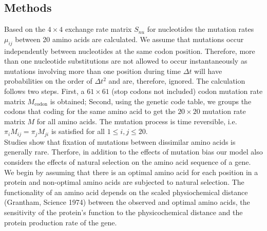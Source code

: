 \documentclass[13pt]{article}
\begin{document}
\subsection{Methods}
Based on the $4 \times 4$ exchange rate matrix $S_{nu}$ for nucleotides the mutation rates $\mu_{ij}$ between 20 amino acids are calculated. We assume that mutations occur independently between nucleotides at the same codon position. Therefore, more than one nucleotide substitutions are not allowed to occur instantaneously as mutations involving more than one position during time $\Delta t$ will have probabilities on the order of $\Delta t^2$ and are, therefore, ignored. The calculation follows two steps. First, a $61 \times 61$ (stop codons not included) codon mutation rate matrix $M_{\text{codon}}$ is obtained; Second, using the genetic code table, we groups the codons that coding for the same amino acid to get the $20 \times 20$ mutation rate matrix $M$ for all amino acids. The mutation process is time reversible, i.e. $\pi_i M_{ij} = \pi_j M_{ji}$ is satisfied for all $1 \le i, j \le 20$.\\

Studies show that fixation of mutations between dissimilar amino acids is generally rare. Therfore, in addition to the effects of mutation bias our model also considers the effects of natural selection on the amino acid sequence of a gene. We begin by assuming that there is an optimal amino acid for each position in a protein and non-optimal amino acids are subjected to natural selection. The functionality of an amino acid depends on the scaled physiochemical distance (Grantham, Science 1974) between the observed and optimal amino acids, the sensitivity of the protein's function to the physicochemical distance and the protein production rate of the gene. \\
\end{document}
